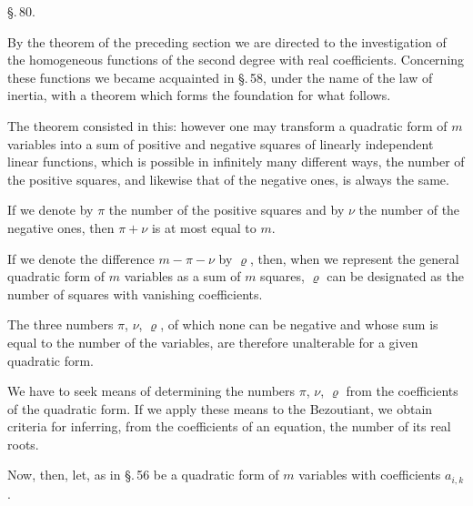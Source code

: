 
\begin{center}
\S.\,80.

\end{center}

By the theorem of the preceding section we are directed to the investigation of the homogeneous functions of the second degree with real coefficients. Concerning these functions we became acquainted in \S.\,58, under the name of the law of inertia, with a theorem which forms the foundation for what follows.

The theorem consisted in this: however one may transform a quadratic form of $m$ variables into a sum of positive and negative squares of linearly independent linear functions, which is possible in infinitely many different ways, the number of the positive squares, and likewise that of the negative ones, is always the same.

If we denote by $\pi$ the number of the positive squares and by $\nu$ the number of the negative ones, then $\pi + \nu$ is at most equal to $m$.

If we denote the difference $m - \pi - \nu$ by $\varrho$, then, when we represent the general quadratic form of $m$ variables as a sum of $m$ squares, $\varrho$ can be designated as the number of squares with vanishing coefficients.

The three numbers $\pi$, $\nu$, $\varrho$, of which none can be negative and whose sum is equal to the number of the variables,
are therefore unalterable for a given quadratic form.

We have to seek means of determining the numbers $\pi$, $\nu$, $\varrho$ from the coefficients of the quadratic form. If we apply these means to the Bezoutiant, we obtain criteria for inferring, from the coefficients of an equation, the number of its real roots.

Now, then, let, as in \S.\,56
be a quadratic form of $m$ variables with  coefficients $a_{i,k}$.
